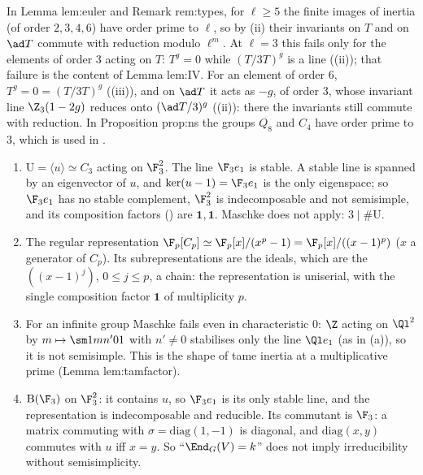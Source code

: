 \begin{paperlink}
In Lemma lem:euler and Remark rem:types, for $\ell\ge5$ the finite images of inertia (of order $2,3,4,6$) have order prime to $\ell$, so by (ii)
their invariants on $T$ and on $\ad T$ commute with reduction modulo $\ell^m$. At $\ell=3$ this fails only for the elements of order $3$ acting on $T$:
$T^g=0$ while $(T/3T)^g$ is a line ((ii)); that failure is the content of Lemma lem:IV. For an element of
order $6$, $T^g=0=(T/3T)^g$ ((iii)), and on $\ad T$ it acts as $-g$, of order $3$, whose invariant line
$\Z_3(1-2g)$ reduces onto $(\ad T/3)^g$ ((ii)): there the invariants still commute with reduction. In Proposition prop:ns the groups $Q_8$ and $C_4$ have order
prime to $3$, which is used in .
\end{paperlink}

\begin{example}\label{ex:reps:maschke-fails}
\begin{enumerate}[label=(\alph*)]
\item $\mathrm U=\langle u\rangle\simeq C_3$ acting on $\F_3^2$. The line $\F_3e_1$ is stable. A stable line is spanned by an eigenvector of $u$, and
$\ker(u-1)=\F_3e_1$ is the only eigenspace; so $\F_3e_1$ has no stable complement, $\F_3^2$ is indecomposable and not semisimple, and its
composition factors () are $\mathbf1,\mathbf1$. Maschke does not apply: $3\mid\#\mathrm U$.
\item The regular representation $\F_p[C_p]\simeq\F_p[x]/(x^p-1)=\F_p[x]/((x-1)^p)$ ($x$ a generator of $C_p$). Its subrepresentations are the ideals,
which are the $((x-1)^j)$, $0\le j\le p$, a chain: the representation is uniserial, with the single composition factor $\mathbf1$ of
multiplicity $p$.
\item For an infinite group Maschke fails even in characteristic $0$: $\Z$ acting on $\Ql^2$ by $m\mapsto\sm1{mn'}01$ with $n'\ne0$ stabilises
only the line $\Ql e_1$ (as in (a)), so it is not semisimple. This is the shape of tame inertia at a multiplicative prime
(Lemma lem:tamfactor).
\item $\mathrm B(\F_3)$ on $\F_3^2$: it contains $u$, so $\F_3e_1$ is its only stable line, and the representation is indecomposable and reducible.
Its commutant is $\F_3$: a matrix commuting with $\sigma=\mathrm{diag}(1,-1)$ is diagonal, and $\mathrm{diag}(x,y)$ commutes with $u$ iff $x=y$. So
``$\End_G(V)=k$'' does not imply irreducibility without semisimplicity.
\end{enumerate}
\end{example}

